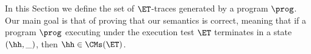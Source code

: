 %
%
%

In this Section we define the set of $\ET$-traces generated by a program 
$\prog$. Our main goal is that of proving that our semantics is correct, 
meaning that if a program $\prog$ executing under the execution 
test $\ET$ terminates in a state $(\hh, \_)$, then $\hh \in \CMs(\ET)$. 

